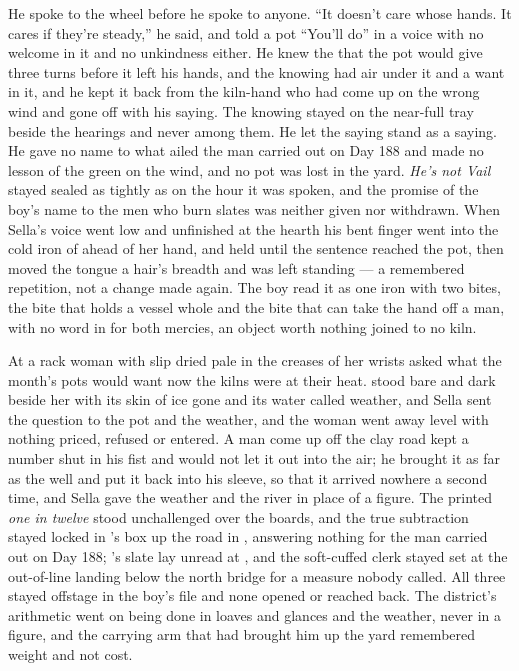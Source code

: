 He spoke to the wheel before he spoke to anyone. “It doesn't care whose hands. It cares if they're steady,” he said, and told a pot “You'll do” in a voice with no welcome in it and no unkindness either. He knew the  that the pot would give three turns before it left his hands, and the knowing had air under it and a want in it, and he kept it back from the kiln-hand who had come up on the wrong wind and gone off with his saying. The knowing stayed on the near-full tray beside the hearings and never among them. He let the saying stand as a saying. He gave no name to what ailed the man carried out on Day 188 and made no lesson of the green on the wind, and no pot was lost in the yard. \emph{He's not Vail} stayed sealed as tightly as on the hour it was spoken, and the promise of the boy's name to the men who burn slates was neither given nor withdrawn. When Sella's voice went low and unfinished at the hearth his bent finger went into the cold iron of  ahead of her hand, and held until the sentence reached the pot, then moved the tongue a hair's breadth and was left standing --- a remembered repetition, not a change made again. The boy read it as one iron with two bites, the bite that holds a vessel whole and the bite that can take the hand off a man, with no word in  for both mercies, an object worth nothing joined to no kiln.

\scenebreak

At  a rack woman with slip dried pale in the creases of her wrists asked what the month's pots would want now the kilns were at their heat.  stood bare and dark beside her with its skin of ice gone and its water called weather, and Sella sent the question to the pot and the weather, and the woman went away level with nothing priced, refused or entered. A man come up off the clay road kept a number shut in his fist and would not let it out into the air; he brought it as far as the well and put it back into his sleeve, so that it arrived nowhere a second time, and Sella gave the weather and the river in place of a figure. The printed \emph{one in twelve} stood unchallenged over the boards, and the true subtraction stayed locked in 's box up the road in , answering nothing for the man carried out on Day 188; 's slate lay unread at , and the soft-cuffed clerk stayed set at the out-of-line landing below the north bridge for a measure nobody called. All three stayed offstage in the boy's file and none opened or reached back. The district's arithmetic went on being done in loaves and glances and the weather, never in a figure, and the carrying arm that had brought him up the yard remembered weight and not cost.

